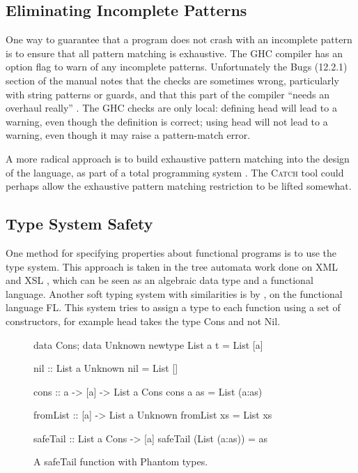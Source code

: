 \documentclass[preprint]{sigplanconf}
\newcommand{\C}[1]{\textsf{#1}}
\newcommand{\catch}{\textsc{Catch}}
\begin{document}
\subsection{Eliminating Incomplete Patterns}

One way to guarantee that a program does not crash with an incomplete pattern is to ensure that all pattern matching is exhaustive. The GHC compiler \citep{ghc} has an option flag to warn of any incomplete patterns. Unfortunately the Bugs (12.2.1) section of the manual notes that the checks are sometimes wrong, particularly with string patterns or guards, and that this part of the compiler ``needs an overhaul really'' \citep{ghc}. The GHC checks are only local: defining \C{head} will lead to a warning, even though the definition is correct; using \C{head} will not lead to a warning, even though it may raise a pattern-match error.

A more radical approach is to build exhaustive pattern matching into the design of the language, as part of a total programming system \citep{turner:total}. The \catch{} tool could perhaps allow the exhaustive pattern matching restriction to be lifted somewhat.


\subsection{Type System Safety}

One method for specifying properties about functional programs is to use the type system. This approach is taken in the tree automata work done on XML and XSL \citep{static_xslt}, which can be seen as an algebraic data type and a functional language. Another soft typing system with similarities is by \citet{aiken:type_infer}, on the functional language FL. This system tries to assign a type to each function using a set of constructors, for example \C{head} takes the type \C{Cons} and not \C{Nil}.

\begin{figure}
\begin{code}
data Cons; data Unknown
newtype List a t = List [a]

nil :: List a Unknown
nil = List []

cons :: a -> [a] -> List a Cons
cons a as = List (a:as)

fromList :: [a] -> List a Unknown
fromList xs = List xs

safeTail :: List a Cons -> [a]
safeTail (List (a:as)) = as
\end{code}
\caption{A \C{safeTail} function with Phantom types.}
\label{fig:phantom}
\end{figure}
\end{document}
